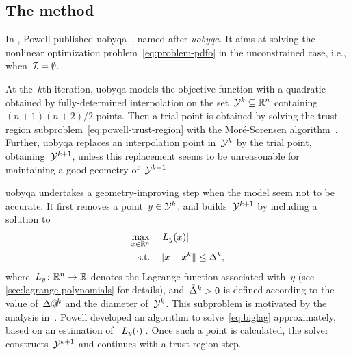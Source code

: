 \subsection{The  method}
\label{subsec:uobyqa}

In , Powell published \gls{uobyqa}~\cite{Powell_2002}, named after \emph{\glsdesc{uobyqa}}.
It aims at solving the nonlinear optimization problem~\cref{eq:problem-pdfo} in the unconstrained case, i.e., when~$\mathcal{I} = \emptyset$.

At the~$k$th iteration, \gls{uobyqa} models the objective function with a quadratic obtained by fully-determined interpolation on the set~$\xpt[k] \subseteq \R^n$ containing~$(n + 1)(n + 2) / 2$ points.
Then a trial point is obtained by solving the trust-region subproblem~\cref{eq:powell-trust-region} with the Mor{\'{e}}-Sorensen algorithm~\cite{More_Sorensen_1983}.
Further, \gls{uobyqa} replaces an interpolation point in~$\xpt[k]$ by the trial point, obtaining~$\xpt[k + 1]$, unless this replacement seems to be unreasonable for maintaining a good geometry of~$\xpt[k + 1]$.

\Gls{uobyqa} undertakes a geometry-improving step when the model seem not to be accurate.
It first removes a point~$y \in \xpt[k]$, and builds~$\xpt[k + 1]$ by including a solution to
\begin{subequations}
    \label{eq:biglag}
    \begin{align}
        \max_{x \in \R^n}   & \quad \abs{\lagp[y](x)}\\
        \text{s.t.}         & \quad \norm{x - \iter[k]} \le \bar{\rad}^k, \label{eq:biglag-tr}
    \end{align}
\end{subequations}
where~$\lagp[y] \colon \R^n \to \R$ denotes the Lagrange function associated with~$y$ (see \cref{sec:lagrange-polynomials} for details), and~$\bar{\rad}^k > 0$ is defined according to the value of~$\rad[k]$ and the diameter of~$\xpt[k]$.
This subproblem is motivated by the analysis in~\cite[\S~2]{Powell_2001}.
Powell developed an algorithm to solve~\cref{eq:biglag} approximately, based on an estimation of~$\abs{\lagp[y](\cdot)}$.
Once such a point is calculated, the solver constructs~$\xpt[k + 1]$ and continues with a trust-region step.

